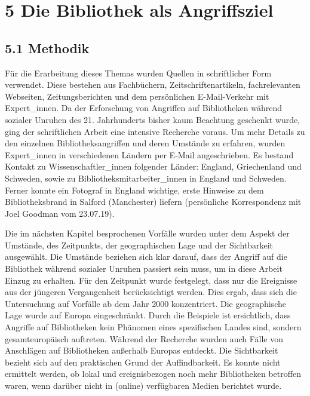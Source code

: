 \documentclass[a4paper,
fontsize=11pt,
oneside,
numbers=noperiodatend,
parskip=half-,
bibliography=totoc,
final
]{scrartcl}
\begin{document}
\hypertarget{die-bibliothek-als-angriffsziel}{%
\section{5 Die Bibliothek als
Angriffsziel}\label{die-bibliothek-als-angriffsziel}}

\hypertarget{methodik}{%
\subsection{5.1 Methodik}\label{methodik}}

Für die Erarbeitung dieses Themas wurden Quellen in schriftlicher Form
verwendet. Diese bestehen aus Fachbüchern, Zeitschriftenartikeln,
fachrelevanten Webseiten, Zeitungsberichten und dem persönlichen
E-Mail-Verkehr mit Expert\_innen. Da der Erforschung von Angriffen auf
Bibliotheken während sozialer Unruhen des 21. Jahrhunderts bisher kaum
Beachtung geschenkt wurde, ging der schriftlichen Arbeit eine intensive
Recherche voraus. Um mehr Details zu den einzelnen Bibliotheksangriffen
und deren Umstände zu erfahren, wurden Expert\_innen in verschiedenen
Ländern per E-Mail angeschrieben. Es bestand Kontakt zu
Wissenschaftler\_innen folgender Länder: England, Griechenland und
Schweden, sowie zu Bibliotheksmitarbeiter\_innen in England und
Schweden. Ferner konnte ein Fotograf in England wichtige, erste Hinweise
zu dem Bibliotheksbrand in Salford (Manchester) liefern (persönliche
Korrespondenz mit Joel Goodman vom 23.07.19).

Die im nächsten Kapitel besprochenen Vorfälle wurden unter dem Aspekt
der Umstände, des Zeitpunkts, der geographischen Lage und der
Sichtbarkeit ausgewählt. Die Umstände beziehen sich klar darauf, dass
der Angriff auf die Bibliothek während sozialer Unruhen passiert sein
muss, um in diese Arbeit Einzug zu erhalten. Für den Zeitpunkt wurde
festgelegt, dass nur die Ereignisse aus der jüngeren Vergangenheit
berücksichtigt werden. Dies ergab, dass sich die Untersuchung auf
Vorfälle ab dem Jahr 2000 konzentriert. Die geographische Lage wurde auf
Europa eingeschränkt. Durch die Beispiele ist ersichtlich, dass Angriffe
auf Bibliotheken kein Phänomen eines spezifischen Landes sind, sondern
gesamteuropäisch auftreten. Während der Recherche wurden auch Fälle von
Anschlägen auf Bibliotheken außerhalb Europas entdeckt. Die Sichtbarkeit
bezieht sich auf den praktischen Grund der Auffindbarkeit. Es konnte
nicht ermittelt werden, ob lokal und ereignisbezogen noch mehr
Bibliotheken betroffen waren, wenn darüber nicht in (online) verfügbaren
Medien berichtet wurde.
\end{document}
